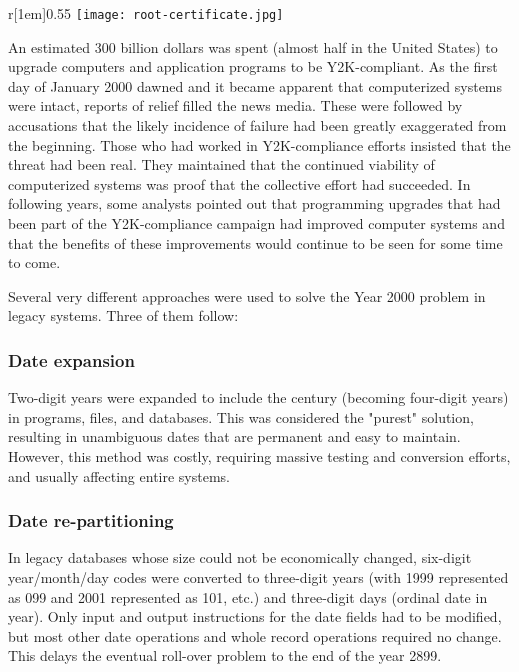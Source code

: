 \documentclass[compilation.tex]{subfiles}
\begin{document}
\begin{wrapfigure}[9]{r}[1em]{0.55\textwidth}
	\vspace{-0.5\baselineskip}
	\texttt{[image: root-certificate.jpg]}
\end{wrapfigure}

An estimated 300 billion dollars was spent (almost half in the United States) to upgrade computers and application programs to be Y2K-compliant. As the first day of January 2000 dawned and it became apparent that computerized systems were intact, reports of relief filled the news media. These were followed by accusations that the likely incidence of failure had been greatly exaggerated from the beginning. Those who had worked in Y2K-compliance efforts insisted that the threat had been real. They maintained that the continued viability of computerized systems was proof that the collective effort had succeeded. In following years, some analysts pointed out that programming upgrades that had been part of the Y2K-compliance campaign had improved computer systems and that the benefits of these improvements would continue to be seen for some time to come.

Several very different approaches were used to solve the Year 2000 problem in legacy systems. Three of them follow:

\subsubsection{Date expansion}
Two-digit years were expanded to include the century (becoming four-digit years) in programs, files, and databases. This was considered the "purest" solution, resulting in unambiguous dates that are permanent and easy to maintain. However, this method was costly, requiring massive testing and conversion efforts, and usually affecting entire systems.

\subsubsection{Date re-partitioning}
In legacy databases whose size could not be economically changed, six-digit year/month/day codes were converted to three-digit years (with 1999 represented as 099 and 2001 represented as 101, etc.) and three-digit days (ordinal date in year). Only input and output instructions for the date fields had to be modified, but most other date operations and whole record operations required no change. This delays the eventual roll-over problem to the end of the year 2899.
\end{document}
